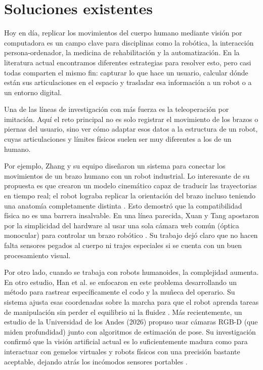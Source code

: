 \section{Soluciones existentes}

Hoy en día, replicar los movimientos del cuerpo humano mediante visión por computadora es un campo clave para disciplinas como la robótica, la interacción persona-ordenador, la medicina de rehabilitación y la automatización. En la literatura actual encontramos diferentes estrategias para resolver esto, pero casi todas comparten el mismo fin: capturar lo que hace un usuario, calcular dónde están sus articulaciones en el espacio y trasladar esa información a un robot o a un entorno digital.

Una de las líneas de investigación con más fuerza es la teleoperación por imitación. Aquí el reto principal no es solo registrar el movimiento de los brazos o piernas del usuario, sino ver cómo adaptar esos datos a la estructura de un robot, cuyas articulaciones y límites físicos suelen ser muy diferentes a los de un humano.

Por ejemplo, Zhang y su equipo diseñaron un sistema para conectar los movimientos de un brazo humano con un robot industrial. Lo interesante de su propuesta es que crearon un modelo cinemático capaz de traducir las trayectorias en tiempo real; el robot lograba replicar la orientación del brazo incluso teniendo una anatomía completamente distinta \cite{Wang2020Fast}. Esto demostró que la compatibilidad física no es una barrera insalvable. En una línea parecida, Xuan y Tang apostaron por la simplicidad del hardware al usar una sola cámara web común (óptica monocular) para controlar un brazo robótico \cite{xuan2017vision}. Su trabajo dejó claro que no hacen falta sensores pegados al cuerpo ni trajes especiales si se cuenta con un buen procesamiento visual.

Por otro lado, cuando se trabaja con robots humanoides, la complejidad aumenta. En otro estudio, Han et al. se enfocaron en este problema desarrollando un método para rastrear específicamente el codo y la muñeca del operario. Su sistema ajusta esas coordenadas sobre la marcha para que el robot aprenda tareas de manipulación sin perder el equilibrio ni la fluidez \cite{han2024robust}. Más recientemente, un estudio de la Universidad de los Andes (2026) propuso usar cámaras RGB-D (que miden profundidad) junto con algoritmos de estimación de pose. Su investigación confirmó que la visión artificial actual es lo suficientemente madura como para interactuar con gemelos virtuales y robots físicos con una precisión bastante aceptable, dejando atrás los incómodos sensores portables \cite{alibeigi2017inverse}.

